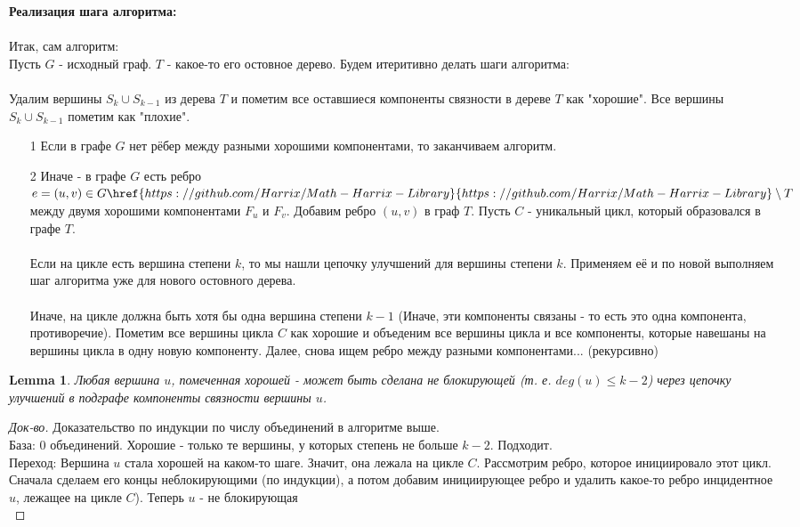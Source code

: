 \documentclass[a4paper, 12pt]{article}
\newtheorem{lemma}[theorem]{Lemma}
\begin{document}
\textbf{Реализация шага алгоритма:}\\
\\
Итак, сам алгоритм:\\
Пусть $G$ - исходный граф. $T$ - какое-то его остовное дерево. Будем итеритивно делать шаги алгоритма:\\
\\
Удалим вершины $S_k \cup S_{k - 1}$ из дерева $T$ и пометим все оставшиеся компоненты связности в дереве $T$ как "хорошие". Все вершины $S_k \cup S_{k - 1}$ пометим как "плохие".\\
\begin{enumerate}

\item[1] Если в графе $G$ нет рёбер между разными хорошими компонентами, то заканчиваем алгоритм.

\item[2] Иначе - в графе $G$ есть ребро $e = (u, v) \in G\href{https://github.com/Harrix/Math-Harrix-Library}{https://github.com/Harrix/Math-Harrix-Library} \setminus T$ между двумя хорошими компонентами $F_u$ и $F_v$. Добавим ребро $(u, v)$ в граф $T$. Пусть $C$ - уникальный цикл, который образовался в графе $T$.\\\\
Если на цикле есть вершина степени $k$, то мы нашли цепочку улучшений для вершины степени $k$. Применяем её и по новой выполняем шаг алгоритма уже для нового остовного дерева.\\\\
Иначе, на цикле должна быть хотя бы одна вершина степени $k - 1$ (Иначе, эти компоненты связаны - то есть это одна компонента, противоречие). Пометим все вершины цикла $C$ как хорошие и объеденим все вершины цикла и все компоненты, которые навешаны на вершины цикла в одну новую компоненту. Далее, снова ищем ребро между разными компонентами... (рекурсивно)

\end{enumerate}

\begin{lemma}
Любая вершина $u$, помеченная хорошей - может быть сделана не блокирующей (т. е. $deg(u) \leqslant k - 2 $) через цепочку улучшений в подграфе компоненты связности вершины $u$.
\end{lemma}
\begin{proof}[Док-во]
Доказательство по индукции по числу объединений в алгоритме выше.\\
База: 0 объединений. Хорошие - только те вершины, у которых степень не больше $k - 2$. Подходит.\\
Переход: Вершина $u$ стала хорошей на каком-то шаге. Значит, она лежала на цикле $C$. Рассмотрим ребро, которое инициировало этот цикл. Сначала сделаем его концы неблокирующими (по индукции), а потом добавим инициирующее ребро и удалить какое-то ребро инцидентное $u$, лежащее на цикле $C$). Теперь $u$ - не блокирующая\\
\end{proof}
\end{document}
